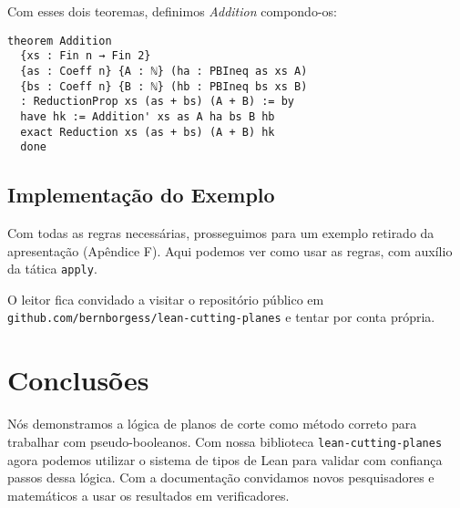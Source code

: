 \documentclass[conference]{IEEEtran}
\begin{document}
Com esses dois teoremas, definimos \textit{Addition} compondo-os:

\begin{verbatim}
theorem Addition
  {xs : Fin n → Fin 2}
  {as : Coeff n} {A : ℕ} (ha : PBIneq as xs A)
  {bs : Coeff n} {B : ℕ} (hb : PBIneq bs xs B)
  : ReductionProp xs (as + bs) (A + B) := by
  have hk := Addition' xs as A ha bs B hb
  exact Reduction xs (as + bs) (A + B) hk
  done
\end{verbatim}


\newpage
\subsection{Implementação do Exemplo}
Com todas as regras necessárias, prosseguimos para um exemplo retirado da apresentação
(Apêndice F). Aqui podemos ver como usar as regras, com auxílio da tática \texttt{apply}.


O leitor fica convidado a visitar o repositório público em \texttt{github.com/bernborgess/lean-cutting-planes}
e tentar por conta própria.


\section*{Conclusões}
Nós demonstramos a lógica de planos de corte como método correto para trabalhar com pseudo-booleanos.
Com nossa biblioteca \texttt{lean-cutting-planes} agora podemos utilizar o sistema de tipos de Lean
para validar com confiança passos dessa lógica. Com a documentação convidamos novos pesquisadores e
matemáticos a usar os resultados em verificadores.
\end{document}
